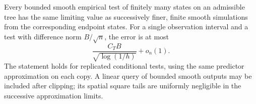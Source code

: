 \begin{proposition}
\label{prop:path-simulation}
Every bounded smooth empirical test of finitely many states on an
admissible tree has the same limiting value as successively finer,
finite smooth simulations from the corresponding endpoint states.
For a single observation interval and a test with difference norm
$B/\sqrt n$, the error is at most
\begin{equation}
 \frac{C_TB}{\sqrt{\log(1/h)}}+o_n(1).
 \label{eq:path-simulation-error}
\end{equation}
The statement holds for replicated conditional tests, using the same
predictor approximation on each copy.  A linear query of bounded smooth
outputs may be included after clipping; its spatial square tails are
uniformly negligible in the successive approximation limits.
\end{proposition}

